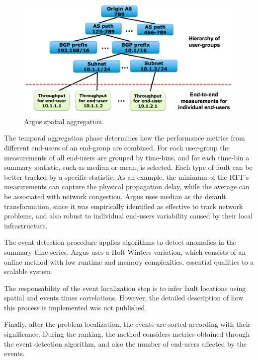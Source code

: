 \begin{figure}[H]
    \centering
    \includegraphics[width=1.0\textwidth]{./figures/literature_review/argus_spatial_aggregation.png}
    \caption{Argus spatial aggregation.}
    \label{fig:argus_spatial_aggregation}
\end{figure}%

The temporal aggregation phase determines how the performance metrics
from different end-users of an end-group are combined.
For each user-group the
measurements of all end-users are grouped by time-bins, and for each
time-bin a summary statistic, such as median or mean, is selected.
Each type of fault can be better tracked by a specific statistic.
As an example, the
minimum of the RTT's measurements can capture the physical propagation delay,
while the average can be associated with network congestion. Argus uses median
as the default transformation, since it was empirically identified as
effective to track network problems, and also robust to individual
end-users variability caused by their local infrastructure.

The event detection procedure applies algorithms to detect anomalies in the
summary time series. Argus uses a Holt-Winters variation,  which consists of
an online
method with low runtime and memory complexities, essential qualities to a
scalable system.

The responsability of the event localization step is to infer fault locations
using spatial and events times correlations.
However, the detailed description of how this
process is implemented was not published.

Finally, after the problem localization, the events are sorted according with
their
significance. During the ranking, the method considers metrics obtained
through the event detection
algorithm, and also the number of end-users affected by the events.

